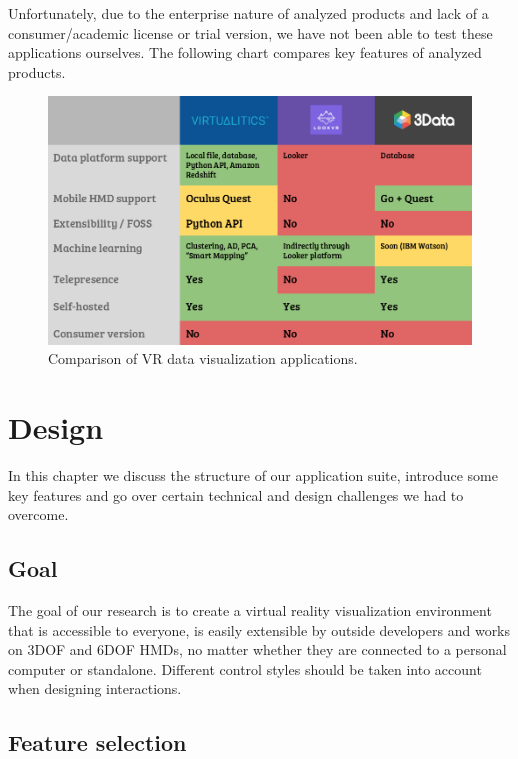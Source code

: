 \documentclass{article}
\begin{document}
Unfortunately, due to the enterprise nature of analyzed products and lack of a consumer/academic license or trial version, we have not been able to test these applications ourselves. The following chart compares key features of analyzed products.\\

\begin{figure}[!h]
\centering
\includegraphics[scale=0.35]{images/comparison}
\caption{Comparison of VR data visualization applications.}
\label{fig:comparison}
\end{figure}

\section{Design}

In this chapter we discuss the structure of our application suite, introduce some key features and go over certain technical and design challenges we had to overcome.

\subsection{Goal}

The goal of our research is to create a virtual reality visualization environment that is accessible to everyone, is easily extensible by outside developers and works on 3DOF and 6DOF HMDs, no matter whether they are connected to a personal computer or standalone. Different control styles should be taken into account when designing interactions.

\subsection{Feature selection}
\end{document}
